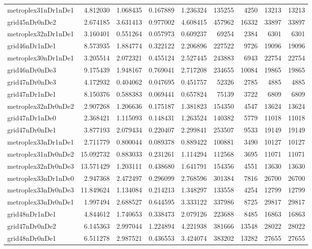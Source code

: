 \begin{longtable}{|l|r|r|r|r|r|r|r|r|}
metroplex31nDr1nDe1 & 4.812030 & 1.068435 & 0.167889 & 1.236324 & 135255 & 4250 & 13213 & 13213 \\
grid45nDr0nDe2 & 2.674185 & 3.631413 & 0.977002 & 4.608415 & 457962 & 16332 & 33897 & 33897 \\
metroplex32nDr1nDe1 & 3.160401 & 0.551264 & 0.057973 & 0.609237 & 69254 & 2384 & 6301 & 6301 \\
grid46nDr1nDe1 & 8.573935 & 1.884774 & 0.322122 & 2.206896 & 227522 & 9726 & 19096 & 19096 \\
metroplex30nDr1nDe1 & 3.205514 & 2.072321 & 0.455124 & 2.527445 & 243883 & 6943 & 22754 & 22754 \\
grid46nDr0nDe3 & 9.175439 & 1.948167 & 0.769041 & 2.717208 & 234655 & 10084 & 19865 & 19865 \\
grid47nDr0nDe3 & 4.172932 & 0.404062 & 0.047695 & 0.451757 & 52326 & 2785 & 4885 & 4885 \\
grid47nDr1nDe1 & 8.150376 & 0.588383 & 0.069441 & 0.657824 & 75139 & 3722 & 6809 & 6809 \\
metroplex32nDr0nDe2 & 2.907268 & 1.206636 & 0.175187 & 1.381823 & 154350 & 4547 & 13624 & 13624 \\
grid47nDr1nDe0 & 2.368421 & 1.115093 & 0.148431 & 1.263524 & 140382 & 5779 & 11018 & 11018 \\
grid47nDr0nDe1 & 3.877193 & 2.079434 & 0.220407 & 2.299841 & 253507 & 9533 & 19149 & 19149 \\
metroplex33nDr1nDe1 & 2.711779 & 0.800044 & 0.089378 & 0.889422 & 100881 & 3490 & 10127 & 10127 \\
metroplex31nDr0nDe2 & 15.092732 & 0.883033 & 0.231261 & 1.114294 & 112568 & 3695 & 11071 & 11071 \\
metroplex32nDr0nDe3 & 13.571429 & 1.203111 & 0.438680 & 1.641791 & 154356 & 4551 & 13630 & 13630 \\
metroplex33nDr1nDe0 & 2.947368 & 2.472497 & 0.296099 & 2.768596 & 301384 & 7816 & 26700 & 26700 \\
metroplex33nDr0nDe3 & 11.849624 & 1.134084 & 0.214213 & 1.348297 & 133558 & 4254 & 12799 & 12799 \\
metroplex33nDr0nDe1 & 1.997494 & 2.688527 & 0.644595 & 3.333122 & 337986 & 8725 & 29817 & 29817 \\
grid48nDr1nDe1 & 4.844612 & 1.740653 & 0.338473 & 2.079126 & 223688 & 8485 & 16863 & 16863 \\
grid47nDr0nDe2 & 6.145363 & 2.997044 & 1.224894 & 4.221938 & 381666 & 13548 & 28022 & 28022 \\
grid48nDr0nDe1 & 6.511278 & 2.987521 & 0.436553 & 3.424074 & 383202 & 13282 & 27655 & 27655 \\

\end{longtable}
